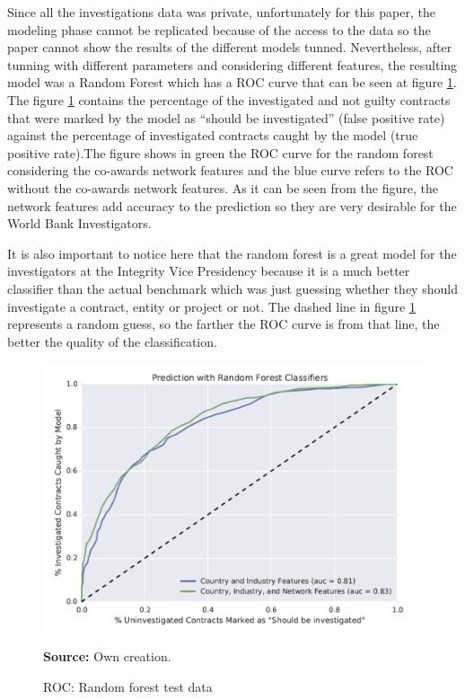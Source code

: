 Since all the investigations data was private, unfortunately for this paper,  the modeling phase cannot be replicated because of the access to the data so the paper cannot show the results of the different models tunned. Nevertheless, after tunning with different parameters and considering different features, the resulting model was a Random Forest which has a ROC curve that can be seen at figure \ref{fig_roc}. The figure \ref{fig_roc} contains the percentage of the  investigated and not guilty contracts that were marked  by the model as ``should be investigated'' (false positive rate) against the percentage of investigated contracts caught by the model (true positive rate).The figure shows in green the ROC curve for the random forest considering the co-awards network features and the blue curve refers to the ROC without the co-awards network features. As it can be seen from the figure, the network features add accuracy to the prediction so they are very desirable for the World Bank Investigators.

It is also important to notice here that the random forest is a great model for the investigators at the Integrity Vice Presidency because it is a much better classifier than the actual benchmark which was just guessing whether they should investigate a contract, entity or project or not. The dashed line in figure \ref{fig_roc} represents a random guess, so the farther the ROC curve is from that line, the better the quality of the classification.

\begin{figure}[H]
\begin{center}
\caption{ROC: Random forest test data}
\label{fig_roc}
\includegraphics[width=1.05\textwidth,keepaspectratio]{../img/roc.jpg}
\end{center}
\noindent \footnotesize{\textbf{Source:} Own creation.}
\end{figure}


